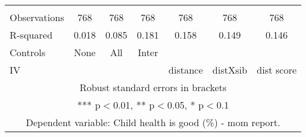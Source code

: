 \begin{tabular}{lcccccc}
 &  &  &  &  &  &  \\
Observations & 768 & 768 & 768 & 768 & 768 & 768 \\
R-squared & 0.018 & 0.085 & 0.181 & 0.158 & 0.149 & 0.146 \\
Controls & None & All & Inter &  &  &  \\
 IV &  &  &  & distance & distXsib & dist score \\ \hline
\multicolumn{7}{c}{ Robust standard errors in brackets} \\
\multicolumn{7}{c}{ *** p$<$0.01, ** p$<$0.05, * p$<$0.1} \\
\multicolumn{7}{c}{ Dependent variable: Child health is good (\%) - mom report.} \\
\end{tabular}
